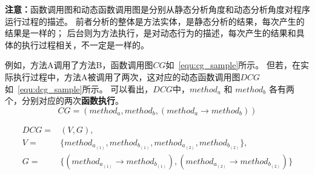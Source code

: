 \textbf{注意：}函数调用图和动态函数调用图是分别从静态分析角度和动态分析角度对程序运行过程的描述。
前者分析的整体是方法实体，是静态分析的结果，每次产生的结果是一样的；
后台则为方法执行，是对动态行为的描述，每次产生的结果和具体的执行过程相关，不一定是一样的。

例如，方法A调用了方法B，函数调用图$CG$如~\ref{equ:cg_sample}所示。
但若，在实际执行过程中，方法A被调用了两次，这对应的动态函数调用图$DCG$如~\ref{equ:dcg_sample}所示。
可以看出，$DCG$中，$method_a$ 和 $method_b$ 各有两个，分别对应的两次\textbf{函数执行}。
\begin{equation}
CG = ({method_a,method_b},{(method_a \to method_b )} ) \label{equ:cg_sample}
\end{equation}

\begin{equation}
\begin{aligned}
DCG = &(V,G) ,\\ 
V = & \{method_{a_{(1)}},method_{b_{(1)}},method_{a_{(2)}},method_{b_{(2)}}\}, \\ 
G = & \{  
    (  method_{a_{(1)}} \to method_{b_{(1)}}) ,( method_{a_{(2)}} \to method_{b_{(2)}})
 \} 
\end{aligned}
\label{equ:dcg_sample} 
\end{equation}





